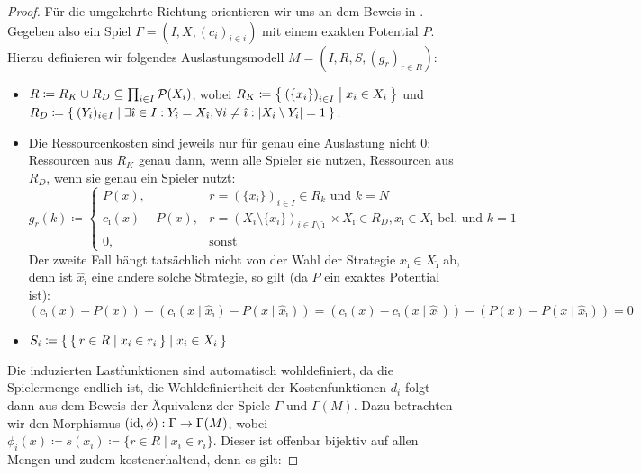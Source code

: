 \begin{proof}
		
	Für die umgekehrte Richtung orientieren wir uns an dem Beweis in \cite[Theorem 1]{MultiPotGames}. Gegeben also ein Spiel $\Gamma = (I, X, (c_i)_{i\in i})$ mit einem exakten Potential $P$. Hierzu definieren wir folgendes Auslastungsmodell $M = (I, R, S, (g_r)_{r \in R})$:
	\begin{itemize}
		\item $R \coloneqq R_K \cup R_D \subseteq \prod_{i \in I}\mathcal{P}(X_i)$, wobei $R_K \coloneqq \Set{\left(\{x_i\}\right)_{i \in I} | x_i \in X_i }$ und \\ $R_D \coloneqq \Set{(Y_i)_{i \in I} | \exists \hat{\imath} \in I: Y_{\hat{\imath}} = X_{\hat{\imath}}, \forall i \neq \hat{\imath}: \left|X_i \setminus Y_i\right| = 1 }$.
		\item Die Ressourcenkosten sind jeweils nur für genau eine Auslastung nicht $0$: Ressourcen aus $R_K$ genau dann, wenn alle Spieler sie nutzen, Ressourcen aus $R_D$, wenn sie genau ein Spieler nutzt:
				\[g_r(k) \coloneqq 
					\begin{cases}
						P(x), 					&r = \left(\{x_i\}\right)_{i \in I} \in R_k 													\text{ und } k=N \\
						c_{\hat{\imath}}(x) - P(x), 	&r = \left(X_i\setminus\{x_i\}\right)_{i \in I\setminus\hat{\imath}} \times X_{\hat{\imath}} \in R_D, x_{\hat{\imath}} \in X_{\hat{\imath}} \text{ bel. und } k=1 \\
						0,						&\text{sonst}
					\end{cases}
				\]
			Der zweite Fall hängt tatsächlich nicht von der Wahl der Strategie $x_{\hat{\imath}} \in X_{\hat{\imath}}$ ab, denn ist $\hat{x}_{\hat{\imath}}$ eine andere solche Strategie, so gilt (da $P$ ein exaktes Potential ist):
			\[\left(c_{\hat{\imath}}(x) - P(x)\right) - \left(c_{\hat{\imath}}(x \mid \hat{x}_{\hat{\imath}}) - P(x \mid \hat{x}_{\hat{\imath}})\right) = \left(c_{\hat{\imath}}(x) - c_{\hat{\imath}}(x \mid \hat{x}_{\hat{\imath}})\right) - \left(P(x) - P(x \mid \hat{x}_{\hat{\imath}})\right) = 0\]
		\item $S_i \coloneqq \Set{ \Set{r \in R | x_i \in r_i} | x_i \in X_i }$
	\end{itemize}
	Die induzierten Lastfunktionen sind automatisch wohldefiniert, da die Spielermenge endlich ist, die Wohldefiniertheit der Kostenfunktionen $d_i$ folgt dann aus dem Beweis der Äquivalenz der Spiele $\Gamma$ und $\Gamma(M)$. Dazu betrachten wir den Morphismus $(\mathrm{id}, \phi): \Gamma \to \Gamma(M)$, wobei $\phi_i(x) \coloneqq s(x_i) \coloneqq \{r \in R \mid x_i \in r_i\}$. Dieser ist offenbar bijektiv auf allen Mengen und zudem kostenerhaltend, denn es gilt:

\end{proof}
